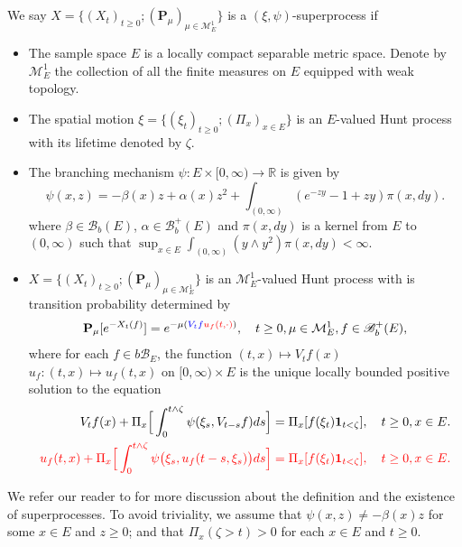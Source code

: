 \documentclass[12pt,oneside,english]{amsart}
\theoremstyle{plain}
\theoremstyle{definition}
\numberwithin{equation}{section}
\newcommand{\added}[1]{{\color{blue}#1}}\newcommand{\deleted}[1]{{\color{red}#1}}
\begin{document}
\subsection{}
\label{sec: definition of superprocess}
    We say $X=\{(X_t)_{t\geq 0}; (\mathbf P_\mu)_{\mu \in \mathcal M^1_E}\}$ is a $(\xi,\psi)$-superprocess if
\begin{itemize}
\item
    The sample space $E$ is a locally compact separable metric space.
    Denote by $\mathcal M_E^1$ the collection of all the finite measures on $E$ equipped with weak topology.
\item
    The spatial motion $\xi=\{(\xi_t)_{t\geq 0};(\Pi_x)_{x\in E}\}$ is an $E$-valued Hunt process with its lifetime denoted by $\zeta$.
\item
    The branching mechanism $\psi: E\times[0,\infty) \to \mathbb R$ is given by
\begin{equation}
\label{eq: branching mechanism}
    \psi(x,z)=
    - \beta(x) z + \alpha (x) z^2 + \int_{(0,\infty)} (e^{-zy} - 1 + zy) \pi(x,dy).
\end{equation}
    where $\beta \in \mathscr B_b(E)$, $\alpha \in \mathscr B^+_b(E)$ and $\pi(x,dy)$ is a kernel from $E$ to $(0,\infty)$ such that $\sup_{x\in E} \int_{(0,\infty)} (y\wedge y^2) \pi(x,dy) < \infty$.
\item
    $X=\{(X_t)_{t\geq 0}; (\mathbf P_\mu)_{\mu \in \mathcal M^1_E}\}$ is an $\mathcal M^1_E$-valued Hunt process with is transition probability determined by
\begin{align}
    \mathbf P_\mu [e^{-X_t(f)}] = e^{-\mu(\added{ V_tf}\deleted{ u_f(t,\cdot)})},
    \quad t\geq 0, \mu \in \mathcal M_E^1, f\in \mathscr B^+_b(E),
\end{align}
    where \added{ for each $f\in b\mathscr B_E$,} the function \added{ $(t,x)\mapsto V_tf(x)$}\deleted{ $u_f:(t,x) \mapsto u_f(t,x)$} on $[0,\infty) \times E$ is the unique locally bounded positive solution to the equation
\begin{align}\label{eq:FKPP_in_definition}
    V_tf(x) + \Pi_x \Big[  \int_0^{t\wedge \zeta} \psi(\xi_s,V_{t-s}f)ds \Big]
    = \Pi_x [ f(\xi_t)\mathbf 1_{t<\zeta} ],
    \quad t \geq 0, x \in E.
    \\
    \deleted{u_f(t,x) + \Pi_x \Big[  \int_0^{t\wedge \zeta} \psi \big(\xi_s,u_f(t-s,\xi_s)\big) ds \Big]
    = \Pi_x [ f(\xi_t)\mathbf 1_{t<\zeta} ],
    \quad t \geq 0, x \in E.}
\end{align}
\end{itemize}
    We refer our reader to \cite{Li2011Measure-valued} for more discussion about the definition and the existence of superprocesses.
    To avoid triviality, we assume that $\psi(x,z)\neq -\beta(x)z$ for some $x \in E$ and $z \geq 0$; and that $\Pi_x(\zeta>t)>0$ for each $x \in E$ and $t \geq 0$.
\end{document}
